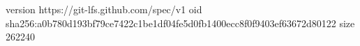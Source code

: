 version https://git-lfs.github.com/spec/v1
oid sha256:a0b780d193bf79ce7422c1be1df04fe5d0fb1400ecc8f0f9403ef63672d80122
size 262240
